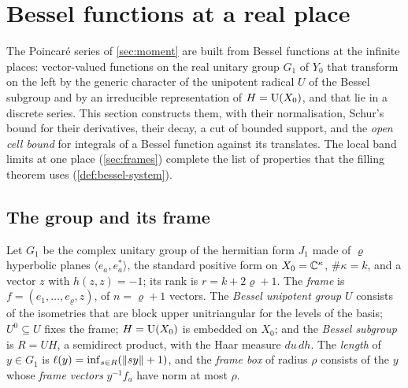 \section{Bessel functions at a real place}\label{sec:bessel}

The Poincar\'e series of \cref{sec:moment} are built from Bessel functions at the infinite places: vector-valued functions on the real
unitary group $G_1$ of $Y_0$ that transform on the left by the generic character of the unipotent radical $U$ of the Bessel subgroup and by an
irreducible representation of $H=\operatorname{U}(X_0)$, and that lie in a discrete series. This section constructs them, with their normalisation, Schur's
bound for their derivatives, their decay, a cut of bounded support, and the \emph{open cell bound} for integrals of a Bessel function against its
translates. The local band limits at one place (\cref{sec:frames}) complete the list of properties that the filling theorem uses
(\cref{def:bessel-system}).

\subsection{The group and its frame}\label{ss:bessel-group}
Let $G_1$ be the complex unitary group of the hermitian form $J_1$ made of $\varrho$ hyperbolic planes $\langle e_a,e^*_a\rangle$, the standard positive form
on $X_0=\mathbb{C}^\kappa$, $\#\kappa=k$, and a vector $z$ with $h(z,z)=-1$; its rank is $r=k+2\varrho+1$. The \emph{frame} is $f=(e_1,\dots,e_\varrho,z)$, of $n=\varrho+1$
vectors. The \emph{Bessel unipotent group} $U$ consists of the isometries that are block upper unitriangular for the levels of the basis; $U^0\subseteq U$ fixes
the frame; $H=\operatorname{U}(X_0)$ is embedded on $X_0$; and the \emph{Bessel subgroup} is $R=UH$, a semidirect product, with the Haar measure $du\,dh$. The
\emph{length} of $y\in G_1$ is $\ell(y)=\inf_{s\in R}(\lVert sy\rVert+1)$, and the \emph{frame box} of radius $\rho$ consists of the $y$ whose \emph{frame vectors}
$y^{-1}f_a$ have norm at most $\rho$.

